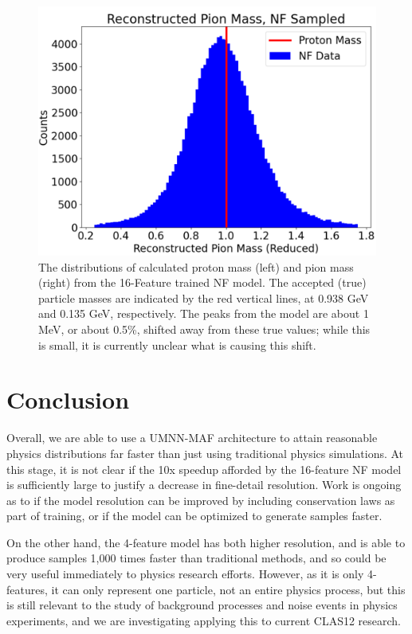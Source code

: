 \begin{figure}[!ht]
\begin{minipage}{0.21245\textwidth}
        \includegraphics[width=.97\textwidth,trim={ 0 0 0 0},clip]{Chapters/Ch3-Simulations/normalizing_flows/pics/FinalPictures/updated_pion_reduced.png}
    \end{minipage}
        \caption{The distributions of calculated proton mass (left) and pion mass (right) from the 16-Feature trained NF model.  The accepted (true) particle masses are indicated by the red vertical lines, at 0.938 GeV and 0.135 GeV, respectively.
        The peaks from the model are about 1 MeV, or about 0.5\%, shifted away from these true values; while this is small, it is currently unclear what is causing this shift.}
    \label{fig:protonspions}
\end{figure}

\section{Conclusion}

Overall, we are able to use a UMNN-MAF architecture to attain reasonable physics distributions far faster than just using traditional physics simulations. At this stage, it is not clear if the 10x speedup afforded by the 16-feature NF model is sufficiently large to justify a decrease in fine-detail resolution. Work is ongoing as to if the model resolution can be improved by including conservation laws as part of training, or if the model can be optimized to generate samples faster. 

On the other hand, the 4-feature model has both higher resolution, and is able to produce samples 1,000 times faster than traditional methods, and so could be very useful immediately to physics research efforts. However, as it is only 4-features, it can only represent one particle, not an entire physics process, but this is still relevant to the study of background processes and noise events in physics experiments, and we are investigating applying this to current CLAS12 research.

